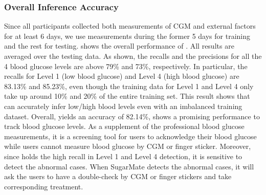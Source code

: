 \subsubsection{Overall Inference Accuracy}
Since all participants collected both measurements of CGM and external factors for at least 6 days, we use measurements during the former 5 days for training and the rest for testing.
 shows the overall performance of \sysname.
All results are averaged over the testing data.
As shown, the recalls and the precisions for all the 4 blood glucose levels are above 79\% and 73\%, respectively.
In particular, the recalls for Level 1 (low blood glucose) and Level 4 (high blood glucose) are 83.13\% and 85.23\%, even though the training data for Level 1 and Level 4 only take up around 10\% and 20\% of the entire training set.
This result shows that \sysname can accurately infer low/high blood levels even with an imbalanced training dataset.
Overall, \sysname yields an accuracy of 82.14\%, shows a promising performance to track blood glucose levels. \textcolor[rgb]{1.00,0.00,0.00}{As a supplement of the professional blood glucose measurements, it is a screening tool for users to acknowledge their blood glucose while users cannot measure blood glucose by CGM or finger sticker. Moreover, since \sysname holds the high recall in Level 1 and Level 4 detection, it is sensitive to detect the abnormal cases. When SugarMate detects the abnormal cases, it will ask the users to have a double-check by CGM or finger stickers and take corresponding treatment.}

